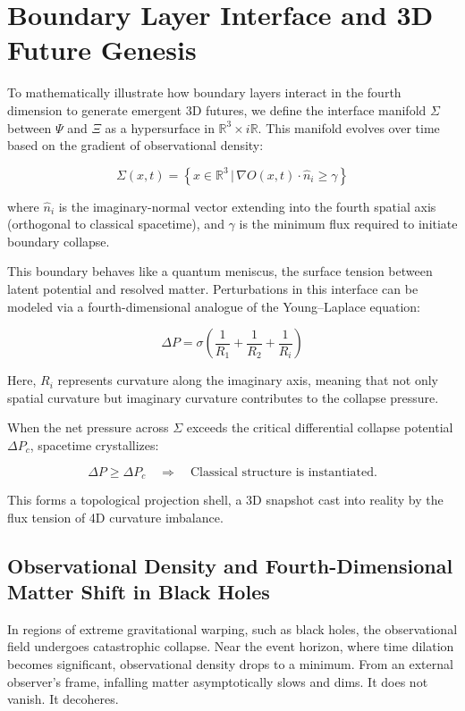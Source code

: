\section{Boundary Layer Interface and 3D Future Genesis}

To mathematically illustrate how boundary layers interact in the fourth dimension to generate emergent 3D futures, we define the interface manifold \( \Sigma \) between \( \Psi \) and \( \Xi \) as a hypersurface in \( \mathbb{R}^3 \times i\mathbb{R} \). This manifold evolves over time based on the gradient of observational density:

\[
\Sigma(x, t) = \left\{ x \in \mathbb{R}^3 \, \bigg| \, \nabla O(x,t) \cdot \hat{n}_i \geq \gamma \right\}
\]

where \( \hat{n}_i \) is the imaginary-normal vector extending into the fourth spatial axis (orthogonal to classical spacetime), and \( \gamma \) is the minimum flux required to initiate boundary collapse.

This boundary behaves like a quantum meniscus, the surface tension between latent potential and resolved matter. Perturbations in this interface can be modeled via a fourth-dimensional analogue of the Young–Laplace equation:

\[
\Delta P = \sigma \left( \frac{1}{R_1} + \frac{1}{R_2} + \frac{1}{R_i} \right)
\]

Here, \( R_i \) represents curvature along the imaginary axis, meaning that not only spatial curvature but imaginary curvature contributes to the collapse pressure.

When the net pressure across \( \Sigma \) exceeds the critical differential collapse potential \( \Delta P_c \), spacetime crystallizes:

\[
\Delta P \geq \Delta P_c \quad \Rightarrow \quad \text{Classical structure is instantiated.}
\]

This forms a topological projection shell, a 3D snapshot cast into reality by the flux tension of 4D curvature imbalance.

\subsection{Observational Density and Fourth-Dimensional Matter Shift in Black Holes}\cite{blackhole_information_coherence}

In regions of extreme gravitational warping, such as black holes, the observational field undergoes catastrophic collapse. Near the event horizon, where time dilation becomes significant, observational density drops to a minimum. From an external observer’s frame, infalling matter asymptotically slows and dims. It does not vanish. It decoheres.

